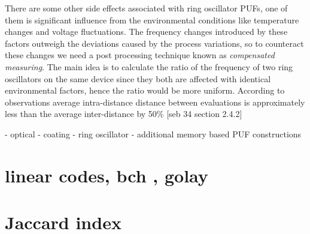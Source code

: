 There are some other side effects associated with ring oscillator PUFs, one of them is significant influence from the environmental conditions like temperature changes and voltage fluctuations. The frequency changes introduced by these factors outweigh the deviations caused by the process variations, so to counteract these changes we need a post processing technique known as \emph{compensated measuring}. The main idea is to calculate the ratio of the frequency of two ring oscillators
on the same device since they both are affected with identical environmental factors, hence the ratio would be more uniform. According to observations average intra-distance distance between evaluations is approximately less than the average inter-distance by 50\% [seb 34 section 2.4.2] 

	- optical
	- coating
	- ring oscillator
	- additional memory based PUF constructions

\section{linear codes, bch , golay}

\section{Jaccard index}

